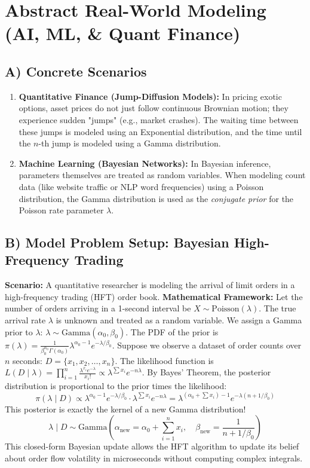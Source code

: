 \documentclass[11pt, a4paper]{article}
\theoremstyle{definition}
\theoremstyle{remark}
\begin{document}
\section{Abstract Real-World Modeling (AI, ML, \& Quant Finance)}

\subsection{A) Concrete Scenarios}
\begin{enumerate}
    \item \textbf{Quantitative Finance (Jump-Diffusion Models):} In pricing exotic options, asset prices do not just follow continuous Brownian motion; they experience sudden "jumps" (e.g., market crashes). The waiting time between these jumps is modeled using an Exponential distribution, and the time until the $n$-th jump is modeled using a Gamma distribution.
    \item \textbf{Machine Learning (Bayesian Networks):} In Bayesian inference, parameters themselves are treated as random variables. When modeling count data (like website traffic or NLP word frequencies) using a Poisson distribution, the Gamma distribution is used as the \textit{conjugate prior} for the Poisson rate parameter $\lambda$.
\end{enumerate}

\subsection{B) Model Problem Setup: Bayesian High-Frequency Trading}
\textbf{Scenario:} A quantitative researcher is modeling the arrival of limit orders in a high-frequency trading (HFT) order book. 
\textbf{Mathematical Framework:}
Let the number of orders arriving in a 1-second interval be $X \sim \text{Poisson}(\lambda)$. The true arrival rate $\lambda$ is unknown and treated as a random variable.
We assign a Gamma prior to $\lambda$: $\lambda \sim \text{Gamma}(\alpha_0, \beta_0)$.
The PDF of the prior is $\pi(\lambda) = \frac{1}{\beta_0^{\alpha_0} \Gamma(\alpha_0)} \lambda^{\alpha_0-1} e^{-\lambda/\beta_0}$.
Suppose we observe a dataset of order counts over $n$ seconds: $D = \{x_1, x_2, \dots, x_n\}$.
The likelihood function is $L(D \mid \lambda) = \prod_{i=1}^n \frac{\lambda^{x_i} e^{-\lambda}}{x_i!} \propto \lambda^{\sum x_i} e^{-n\lambda}$.
By Bayes' Theorem, the posterior distribution is proportional to the prior times the likelihood:
\[ \pi(\lambda \mid D) \propto \lambda^{\alpha_0-1} e^{-\lambda/\beta_0} \cdot \lambda^{\sum x_i} e^{-n\lambda} = \lambda^{(\alpha_0 + \sum x_i) - 1} e^{-\lambda(n + 1/\beta_0)} \]
This posterior is exactly the kernel of a new Gamma distribution!
\[ \lambda \mid D \sim \text{Gamma}\left( \alpha_{\text{new}} = \alpha_0 + \sum_{i=1}^n x_i, \quad \beta_{\text{new}} = \frac{1}{n + 1/\beta_0} \right) \]
This closed-form Bayesian update allows the HFT algorithm to update its belief about order flow volatility in microseconds without computing complex integrals.
\end{document}
